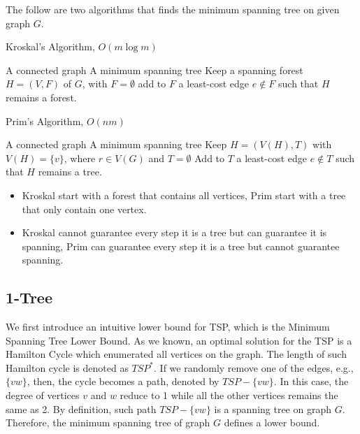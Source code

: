             The follow are two algorithms that finds the minimum spanning tree on given graph $G$.

            \begin{algorithm}
                \caption{Kroskal's Algorithm, $O(m \log m)$}
                \begin{algorithmic}
                    \Require A connected graph
                    \Ensure A minimum spanning tree
                    \State Keep a spanning forest $H=(V, F)$ of $G$, with $F=\emptyset$
                        \State add to $F$ a least-cost edge $e\notin F$ such that $H$ remains a forest.
                    \EndWhile
                \end{algorithmic}
            \end{algorithm}

            \begin{algorithm}
                \caption{Prim's Algorithm, $O(nm)$}
                \begin{algorithmic}
                    \Require A connected graph
                    \Ensure A minimum spanning tree
                    \State Keep $H = (V(H), T)$ with $V(H) = \{v\}$, where $r\in V(G)$ and $T=\emptyset$
                        \State Add to $T$ a least-cost edge $e \notin T$ such that $H$ remains a tree.
                    \EndWhile
                \end{algorithmic}
            \end{algorithm}

            \begin{itemize}
                \item Kroskal start with a forest that contains all vertices, Prim start with a tree that only contain one vertex.
                \item Kroskal cannot guarantee every step it is a tree but can guarantee it is spanning, Prim can guarantee every step it is a tree but cannot guarantee spanning.
            \end{itemize}

        \subsection{1-Tree}
            We first introduce an intuitive lower bound for TSP, which is the Minimum Spanning Tree Lower Bound. As we known, an optimal solution for the TSP is a Hamilton Cycle which enumerated all vertices on the graph. The length of such Hamilton cycle is denoted as $TSP^*$. If we randomly remove one of the edges, e.g., $\{vw\}$, then, the cycle becomes a path, denoted by $TSP - \{vw\}$. In this case, the degree of vertices $v$ and $w$ reduce to 1 while all the other vertices remains the same as 2. By definition, such path $TSP - \{vw\}$ is a spanning tree on graph $G$. Therefore, the minimum spanning tree of graph $G$ defines a lower bound.

